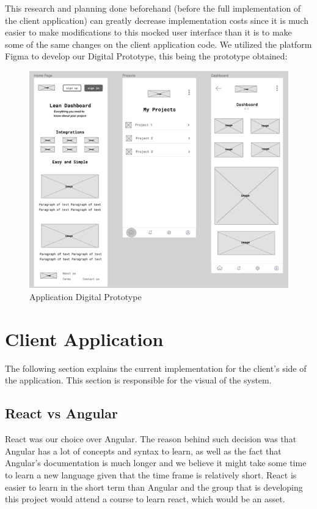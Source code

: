 \documentclass[a4paper,twoside,10pt]{report}
\begin{document}
This research and planning done beforehand (before the full implementation of the client application) can greatly decrease implementation costs since it is much easier to make modifications to this mocked user interface than it is to make some of the same changes on the client application code.
We utilized the platform Figma\cite{FIGMA} to develop our Digital Prototype, this being the prototype obtained:
 
\begin{figure}[h!]
\center
    \includegraphics[width=\textwidth]{digital-prototype.png}
\caption{Application Digital Prototype}
\end{figure}

\chapter{Client Application}
The following section explains the current implementation for the client’s side of the application. This section is responsible for the visual of the system.
 
\section{React vs Angular}
React was our choice over Angular. The reason behind such decision was that Angular has a lot of concepts and syntax to learn, as well as the fact that Angular's documentation is much longer and we believe it might take some time to learn a new language given that the time frame is relatively short. React is easier to learn in the short term than Angular and the group that is developing this project would attend a course to learn react, which would be an asset.
 
\end{document}
